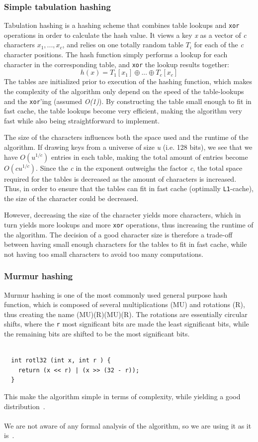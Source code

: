 \documentclass[11pt]{article} %
\begin{document}
\subsubsection{Simple tabulation hashing}
Tabulation hashing is a hashing scheme that combines table lookups and \verb|xor| operations in order to calculate the hash value. It views a key \emph{x} as a vector of \emph{c} characters $x_1, ..., x_c$, and relies on one totally random table $T_i$ for each of the \emph{c} character positions. The hash function simply performs a lookup for each character in the corresponding table, and \verb|xor| the lookup results together:
$$h(x) = T_1[x_1] \oplus ... \oplus T_c[x_c]$$
The tables are initialized prior to execution of the hashing function, which makes the complexity of the algorithm only depend on the speed of the table-lookups and the \verb|xor|'ing (assumed \emph{O(1)}). By constructing the table small enough to fit in fast cache, the table lookups become very efficient, making the algorithm very fast while also being straightforward to implement.

The size of the characters influences both the space used and the runtime of the algorithm. If drawing keys from a universe of size \emph{u} (i.e. 128 bits), we see that we have $O(u^{1/c})$ entries in each table, making the total amount of entries become $O(cu^{1/c})$. Since the \emph{c} in the exponent outweighs the factor \emph{c}, the total space required for the tables is decreased as the amount of characters is increased. Thus, in order to ensure that the tables can fit in fast cache (optimally \verb|L1|-cache), the size of the character could be decreased. 

However, decreasing the size of the character yields more characters, which in turn yields more lookups and more \verb|xor| operations, thus increasing the runtime of the algorithm. The decision of a good character size is therefore a trade-off between having small enough characters for the tables to fit in fast cache, while not having too small characters to avoid too many computations.
%
%
%
\subsubsection{Murmur hashing} Murmur hashing is one of the most commonly used general purpose hash function, which is composed of several multiplications (MU) and rotations (R), thus creating the name (MU)(R)(MU)(R). The rotations are essentially circular shifts, where the \verb|r| most significant bits are made the least significant bits, while the remaining bits are shifted to be the most significant bits.
\\
\begin{lstlisting}[frame=single]  % Start your code-block

  int rotl32 (int x, int r ) {
    return (x << r) | (x >> (32 - r));
  }
\end{lstlisting}
This make the algorithm simple in terms of complexity, while yielding a good distribution~\cite{RAD15}.\\
\\
We are not aware of any formal analysis of the algorithm, so we are using it as it is~\cite{Mur3}.
\end{document}
